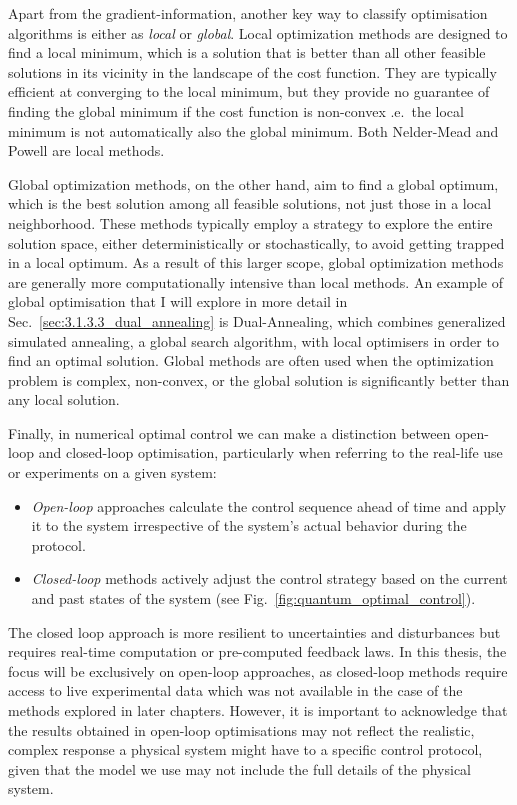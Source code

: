 Apart from the gradient-information, another key way to classify optimisation algorithms is either as \emph{local} or \emph{global}. Local optimization methods are designed to find a local minimum, which is a solution that is better than all other feasible solutions in its vicinity in the landscape of the cost function. They are typically efficient at converging to the local minimum, but they provide no guarantee of finding the global minimum if the cost function is non-convex \@i.e.~the local minimum is not automatically also the global minimum. Both Nelder-Mead and Powell are local methods.

Global optimization methods, on the other hand, aim to find a global optimum, which is the best solution among all feasible solutions, not just those in a local neighborhood. These methods typically employ a strategy to explore the entire solution space, either deterministically or stochastically, to avoid getting trapped in a local optimum. As a result of this larger scope, global optimization methods are generally more computationally intensive than local methods. An example of global optimisation that I will explore in more detail in Sec.~\ref{sec:3.1.3.3_dual_annealing} is Dual-Annealing, which combines generalized simulated annealing\cite{tsallis_generalized_1996}, a global search algorithm, with local optimisers in order to find an optimal solution. Global methods are often used when the optimization problem is complex, non-convex, or the global solution is significantly better than any local solution.

Finally, in numerical optimal control we can make a distinction between open-loop and closed-loop optimisation, particularly when referring to the real-life use or experiments on a given system:
\begin{itemize}
    \item \emph{Open-loop} approaches calculate the control sequence ahead of time and apply it to the system irrespective of the system's actual behavior during the protocol. 
    \item \emph{Closed-loop} methods actively adjust the control strategy based on the current and past states of the system (see Fig.~\ref{fig:quantum_optimal_control}).
\end{itemize}
The closed loop approach is more resilient to uncertainties and disturbances but requires real-time computation or pre-computed feedback laws. In this thesis, the focus will be exclusively on open-loop approaches, as closed-loop methods require access to live experimental data which was not available in the case of the methods explored in later chapters. However, it is important to acknowledge that the results obtained in open-loop optimisations may not reflect the realistic, complex response a physical system might have to a specific control protocol, given that the model we use may not include the full details of the physical system. 

